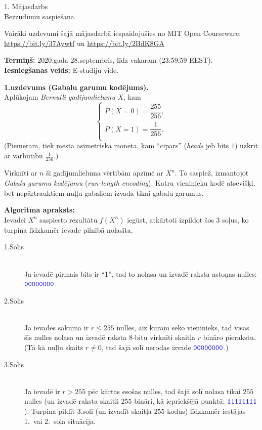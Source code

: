 \documentclass[a4paper]{article}
\begin{document}
\twocolumn


\begin{center}
{\Large 1. Mājasdarbs}\\
{\Large Bezzudumu saspiešana}
\end{center}


{\footnotesize
Vairāki uzdevumi šajā mājasdarbā iespaidojušies no MIT Open Courseware: 
\url{https://bit.ly/37Aywtf} un \url{https://bit.ly/2BdK8GA}\\
}

{\bf Termiņš:} 2020.gada 28.septembris, līdz vakaram (23:59:59 EEST).\\
{\bf Iesniegšanas veids:} E-studiju vide.

\vspace{10pt}
{\bf 1.uzdevums (Gabalu garumu kodējums).}\\
Aplūkojam {\em Bernulli gadījumlielumu} $X$, kam 
$$\left\{
\begin{array}{l}
P(X = 0) = \dfrac{255}{256},\\[6pt]
P(X = 1) = \dfrac{1}{256}.\\
\end{array} \right.$$
(Piemēram, tiek mesta asi\-met\-ris\-ka monēta, kam ``cipars'' 
({\em heads} jeb bits $1$) uzkrīt ar varbūtību $\frac{1}{256}$.)

Virknīti ar $n$ šī gadījumlieluma vērtībām ap\-zī\-mē ar $X^n$. 
To saspiež, izmantojot {\em Gabalu garumu ko\-dē\-ju\-mu} ({\em run-length encoding}).
Katru vieninieku kodē atsevišķi, bet 
nepārtrauktiem nuļļu gabaliem izvada tikai gabalu garumus.

{\bf Algoritma apraksts:}\\
Ievadei $X^n$ saspiesto rezultātu $f(X^n)$ iegūst,
atkārtoti izpildot šos 3 soļus, ko turpina līdzkamēr 
ievade pilnībā nolasīta.

\begin{description}
\item[1.Solis] \hfill \\
Ja ievadē pirmais bits ir ``1'', tad to nolasa un 
izvadē raksta astoņas nulles: 
$\textcolor{blue}{\mathtt{00000000}}$.
\item[2.Solis] \hfill \\
Ja ievades sākumā ir $r \leq 255$ nulles, aiz kurām seko vieninieks, 
tad visas šīs nulles nolasa un 
izvadē raksta $8$-bitu virknīti \textendash{} skaitļa $r$ bināro pierakstu.
(Tā kā nuļļu skaits $r \neq 0$, tad šajā solī nerodas izvade $\textcolor{blue}{\mathtt{00000000}}$.)
\item[3.Solis] \hfill \\
Ja ievadē ir $r > 255$ pēc kārtas esošas nulles, 
tad šajā solī nolasa tikai $255$ nulles (un izvadē raksta skaitli $255$ bināri, kā iepriekšējā punktā:
$\textcolor{blue}{\mathtt{11111111}}$). Turpina pildīt 3.soli (un izvadīt skaitļa 
$255$ kodus) līdzkamēr iestājas 1.\ vai 2.\ soļa situācija.
\end{description}
\end{document}

